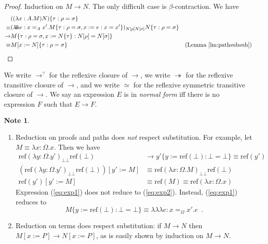 \documentclass[a4paper,UKenglish]{lipics-v2016}
\newcommand*{\reff}[1]{\ensuremath{\mathrm{ref} \left( {#1} \right)}}
\newcommand*{\triplelambda}{\ensuremath{\lambda \!\! \lambda \!\! \lambda}}
\theoremstyle{plain}
\theoremstyle{definition}
\newtheorem{note}[theorem]{Note}
\begin{document}
\begin{proof}
Induction on $M \rightarrow N$.  The only difficult case is $\beta$-contraction.  We have
\begin{align*}
& ((\lambda x:A.M)N)\{ \tau : \rho = \sigma \} \\
\equiv & (\triplelambda e : x =_A x' . M \{ \tau : \rho = \sigma , x := e : x = x' \})_{N [ \rho ] N [ \sigma ]} N \{ \tau : \rho = \sigma \} \\
\rightarrow & M \{ \tau : \rho = \sigma, x := N \{ \tau \} : N [ \rho ] = N [ \sigma ] \} \\
\equiv & M [ x := N ] \{ \tau : \rho = \sigma \} & (\text{Lemma \ref{lm:pathsubsub}})
\end{align*}
\end{proof}

We write $\rightarrow^?$ for the reflexive closure of $\rightarrow$, 
we write $\twoheadrightarrow$ for the reflexive transitive closure of $\rightarrow$, and we write $\simeq$ for the reflexive symmetric transitive closure of $\rightarrow$.
We say an expression $E$ is in \emph{normal form} iff there is no expression $F$ such that $E \rightarrow F$.

\begin{note}
$ $
\begin{enumerate}
\item
Reduction on proofs and paths does \emph{not} respect substitution.  For example, let $M \equiv \lambda x:\Omega.x$.  Then we have
\begin{align}
\reff{\lambda y : \Omega. y'}_{\bot \bot} \reff{\bot} & \rightarrow y' \{ y:= \reff{\bot} : \bot = \bot \} \equiv \reff{y'} \nonumber \\
(\reff{\lambda y : \Omega.y'}_{\bot \bot} \reff{\bot}) [y' := M] & \equiv \reff{\lambda x : \Omega.M}_{\bot \bot} \reff{\bot}
\label{eq:exp1} \\
\label{eq:exp2}
\reff{y'}[y':=M] & \equiv \reff{M} \equiv \reff{\lambda x : \Omega.x}
\end{align}
Expression (\ref{eq:exp1}) does not reduce to (\ref{eq:exp2}).  Instead, (\ref{eq:exp1}) reduces to
$$ M \{ y := \reff{\bot} : \bot = \bot \} \equiv \triplelambda e : x =_\Omega x'. e \enspace . $$
\item
Reduction on terms does respect substitution: if $M \rightarrow N$ then $M[x:=P] \rightarrow N[x:=P]$, as is easily shown by induction on $M \rightarrow N$.
\end{enumerate}
\end{note}
\end{document}
